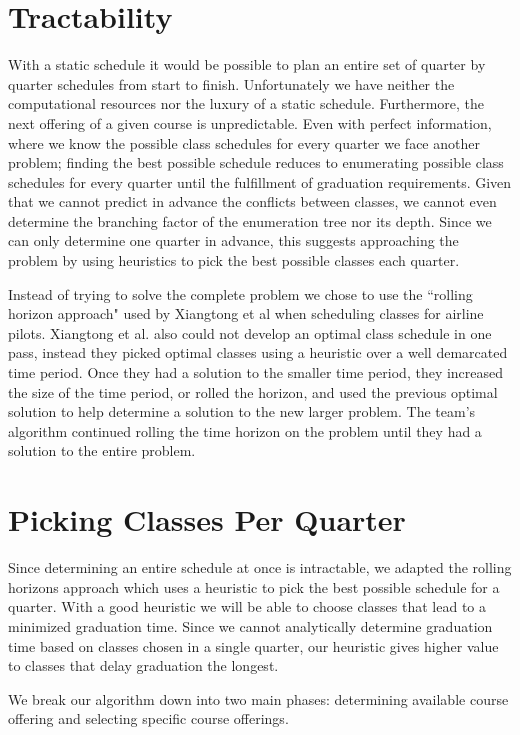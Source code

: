 \documentclass[11pt]{article} %
\begin{document}
\section{Tractability} With a static schedule it would be
possible to plan an entire set of quarter by quarter schedules from start to
finish.  Unfortunately we have neither the computational resources nor the luxury
of a static schedule.  Furthermore, the next offering of a given course is unpredictable.
Even with perfect information, where we know the possible class schedules for every
quarter we face another problem; finding the best possible schedule reduces to
enumerating possible class schedules for every quarter until the fulfillment of graduation
requirements.  Given that we cannot predict in advance the
conflicts between classes, we cannot even determine the branching factor of the
enumeration tree nor its depth.  Since we can only determine one quarter in
advance, this suggests approaching the problem by using heuristics to pick the
best possible classes each quarter.

Instead of trying to solve the complete problem we chose to use the ``rolling
horizon approach" used by Xiangtong et al \cite{xiangton:informs} when
scheduling classes for airline pilots.  Xiangtong et al. also could not develop
an optimal class schedule in one pass, instead they picked optimal classes
using a heuristic over a well demarcated time period.  Once they had a solution
to the smaller time period, they increased the size of the time period, or rolled
the horizon, and used the previous optimal solution to help determine
a solution to the new larger problem.  The team's algorithm continued rolling the
time horizon on the problem until they had a solution to the entire problem.

\section{Picking Classes Per Quarter} Since determining an entire schedule at
once is intractable, we adapted the rolling horizons approach which uses
a heuristic to pick the best possible schedule for a quarter.  With a good
heuristic we will be able to choose classes that lead to a minimized graduation
time.  Since we cannot analytically determine graduation time based on classes
chosen in a single quarter, our heuristic gives higher value to classes
that delay graduation the longest.

We break our algorithm down into two main phases: determining available course
offering and selecting specific course offerings.
\end{document}
